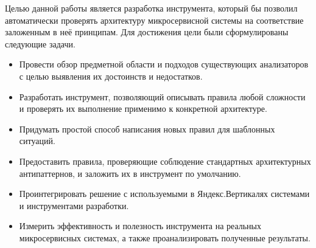 
Целью данной работы является разработка инструмента, который бы позволил автоматически проверять архитектуру микросервисной системы на соответствие заложенным в неё принципам. Для достижения цели были сформулированы следующие задачи.

\begin{itemize}
    \item Провести обзор предметной области и подходов существующих анализаторов с целью выявления их достоинств и недостатков.
    \item Разработать инструмент, позволяющий описывать правила любой сложности и проверять их выполнение применимо к конкретной архитектуре.
    \item Придумать простой способ написания новых правил для шаблонных ситуаций.
    \item Предоставить правила, проверяющие соблюдение стандартных архитектурных антипаттернов, и заложить их в инструмент по умолчанию.
    \item Проинтегрировать решение с используемыми в Яндекс.Вертикалях системами и инструментами разработки.
    \item Измерить эффективность и полезность инструмента на реальных микросервисных системах, а также проанализировать полученные результаты.
\end{itemize}
